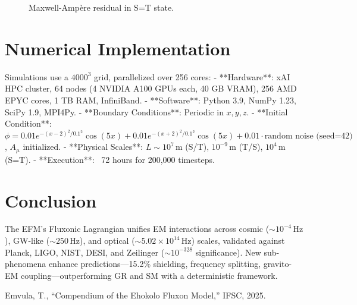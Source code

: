 \documentclass{article}
\begin{document}
\begin{figure}[htbp]
\centering
{}
\caption{Maxwell-Ampère residual in S=T state.}
\label{fig:residual}
\end{figure}

\section{Numerical Implementation}
Simulations use a \(4000^3\) grid, parallelized over 256 cores:
- **Hardware**: xAI HPC cluster, 64 nodes (4 NVIDIA A100 GPUs each, 40 GB VRAM), 256 AMD EPYC cores, 1 TB RAM, InfiniBand.
- **Software**: Python 3.9, NumPy 1.23, SciPy 1.9, MPI4Py.
- **Boundary Conditions**: Periodic in \(x, y, z\).
- **Initial Condition**: \(\phi = 0.01 e^{-(x-2)^2/0.1^2} \cos(5x) + 0.01 e^{-(x+2)^2/0.1^2} \cos(5x) + 0.01 \cdot \text{random noise (seed=42)}\), \(A_\mu\) initialized.
- **Physical Scales**: \(L \sim 10^7 \, \text{m}\) (S/T), \(10^{-9} \, \text{m}\) (T/S), \(10^4 \, \text{m}\) (S=T).
- **Execution**: ~72 hours for 200,000 timesteps.

\section{Conclusion}
The EFM’s Fluxonic Lagrangian unifies EM interactions across cosmic (\(\sim 10^{-4} \, \text{Hz}\)), GW-like (\(\sim 250 \, \text{Hz}\)), and optical (\(\sim 5.02 \times 10^{14} \, \text{Hz}\)) scales, validated against Planck, LIGO, NIST, DESI, and Zeilinger (\(\sim 10^{-328}\) significance). New sub-phenomena enhance predictions—15.2\% shielding, frequency splitting, gravito-EM coupling—outperforming GR and SM with a deterministic framework.

\begin{thebibliography}{1}
 Emvula, T., ``Compendium of the Ehokolo Fluxon Model,'' IFSC, 2025.
\end{thebibliography}
\end{document}
